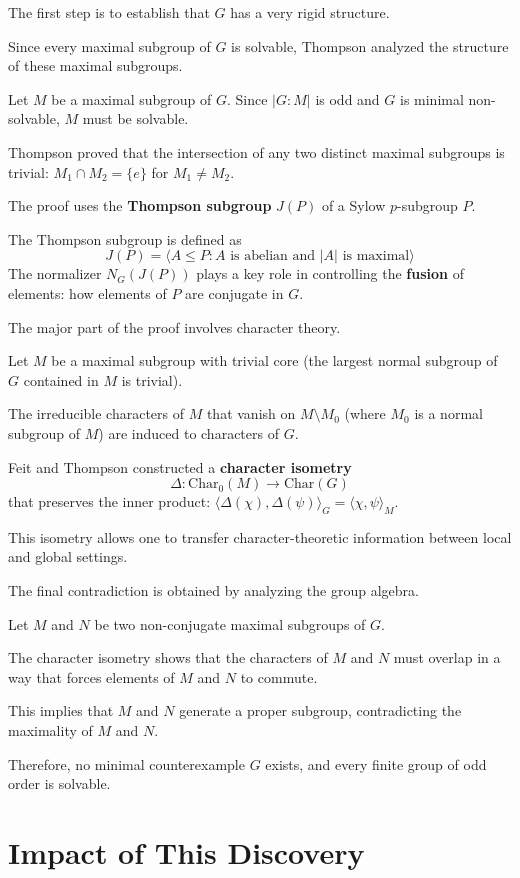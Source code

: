 The first step is to establish that $G$ has a very rigid structure.

Since every maximal subgroup of $G$ is solvable, Thompson analyzed the structure of these maximal subgroups.

Let $M$ be a maximal subgroup of $G$. Since $|G:M|$ is odd and $G$ is minimal non-solvable, $M$ must be solvable.

Thompson proved that the intersection of any two distinct maximal subgroups is trivial: $M_1 \cap M_2 = \{e\}$ for $M_1 \neq M_2$.

The proof uses the \textbf{Thompson subgroup} $J(P)$ of a Sylow $p$-subgroup $P$.

The Thompson subgroup is defined as
\[
J(P) = \langle A \leq P : A \text{ is abelian and } |A| \text{ is maximal} \rangle
\]
The normalizer $N_G(J(P))$ plays a key role in controlling the \textbf{fusion} of elements: how elements of $P$ are conjugate in $G$.

The major part of the proof involves character theory.

Let $M$ be a maximal subgroup with trivial core (the largest normal subgroup of $G$ contained in $M$ is trivial).

The irreducible characters of $M$ that vanish on $M \setminus M_0$ (where $M_0$ is a normal subgroup of $M$) are induced to characters of $G$.

Feit and Thompson constructed a \textbf{character isometry}
\[
\Delta: \text{Char}_0(M) \to \text{Char}(G)
\]
that preserves the inner product: $\langle \Delta(\chi), \Delta(\psi) \rangle_G = \langle \chi, \psi \rangle_M$.

This isometry allows one to transfer character-theoretic information between local and global settings.

The final contradiction is obtained by analyzing the group algebra.

Let $M$ and $N$ be two non-conjugate maximal subgroups of $G$.

The character isometry shows that the characters of $M$ and $N$ must overlap in a way that forces elements of $M$ and $N$ to commute.

This implies that $M$ and $N$ generate a proper subgroup, contradicting the maximality of $M$ and $N$.

Therefore, no minimal counterexample $G$ exists, and every finite group of odd order is solvable.

\section{Impact of This Discovery}

